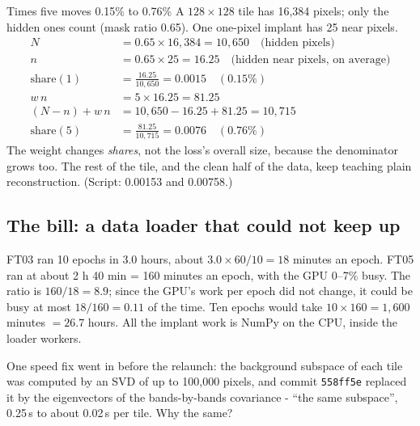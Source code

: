 \begin{worked}[label={we:ftruns:nearweight}]{Times five moves 0.15\% to 0.76\%}
A $128 \times 128$ tile has 16,384 pixels; only the hidden ones count (mask ratio 0.65). One one-pixel implant has 25
near pixels.
\begin{align*}
N &= 0.65 \times 16{,}384 = 10{,}650 \quad\text{(hidden pixels)}\\
n &= 0.65 \times 25 = 16.25 \quad\text{(hidden near pixels, on average)}\\
\text{share}(1) &= \frac{16.25}{10{,}650} = 0.0015 \quad (0.15\%)\\
w\,n &= 5 \times 16.25 = 81.25\\
(N - n) + w\,n &= 10{,}650 - 16.25 + 81.25 = 10{,}715\\
\text{share}(5) &= \frac{81.25}{10{,}715} = 0.0076 \quad (0.76\%)
\end{align*}
The weight changes \emph{shares}, not the loss's overall size, because the denominator grows too. The rest of the
tile, and the clean half of the data, keep teaching plain reconstruction. (Script: 0.00153 and 0.00758\tagC.)
\end{worked}


\subsection{The bill: a data loader that could not keep up}

FT03 ran 10 epochs in 3.0 hours, about $3.0 \times 60 / 10 = 18$ minutes an epoch. FT05 ran at about 2 h 40 min =
160 minutes an epoch, with the GPU 0--7\% busy.
The ratio is $160 / 18 = 8.9$; since the GPU's work per epoch did not change, it could be busy at most $18 / 160 =
0.11$ of the time. Ten epochs would take $10 \times 160 = 1{,}600$ minutes $= 26.7$ hours. All the implant work is NumPy
on the CPU, inside the loader workers.

One speed fix went in before the relaunch: the background subspace of each tile was computed by an SVD of up to
100,000 pixels, and commit \texttt{558ff5e} replaced it by the eigenvectors of the bands-by-bands covariance - ``the
same subspace'', 0.25\,s to about 0.02\,s per tile. Why the same? 

